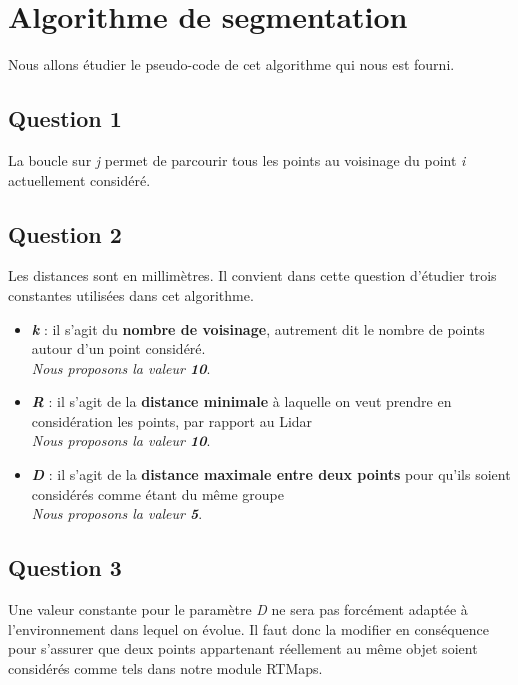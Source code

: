\chapter{Algorithme de segmentation}
Nous allons étudier le pseudo-code de cet algorithme qui nous est fourni.
\section{Question 1}
La boucle sur \textit{j} permet de parcourir tous les points au voisinage du point \textit{i} actuellement considéré. 

\section{Question 2}
Les distances sont en millimètres. Il convient dans cette question d'étudier trois constantes utilisées dans cet algorithme.
\begin{itemize}
  \item \textbf{\textit{k}} : il s'agit du \textbf{nombre de voisinage}, autrement dit le nombre de points autour d'un point considéré.\\\textit{Nous proposons la valeur \textbf{10}}.

\medskip

  \item \textbf{\textit{R}} : il s'agit de la \textbf{distance minimale} à laquelle on veut prendre en considération les points, par rapport au Lidar\\\textit{Nous proposons la valeur \textbf{10}}.

\medskip

  \item \textbf{\textit{D}} : il s'agit de la \textbf{distance maximale entre deux points} pour qu'ils soient considérés comme étant du même groupe\\\textit{Nous proposons la valeur \textbf{5}}.
\end{itemize}

\section{Question 3}
Une valeur constante pour le paramètre \textit{D} ne sera pas forcément adaptée à l'environnement dans lequel on évolue. Il faut donc la modifier en conséquence pour s'assurer que deux points appartenant réellement au même objet soient considérés comme tels dans notre module RTMaps.

\medskip

